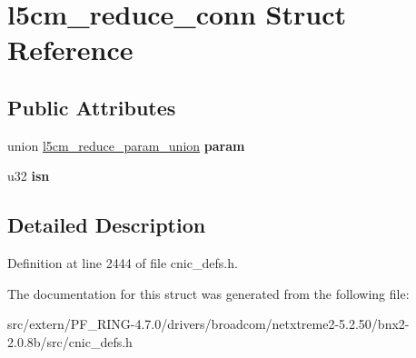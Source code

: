 \hypertarget{structl5cm__reduce__conn}{
\section{l5cm\_\-reduce\_\-conn Struct Reference}
\label{structl5cm__reduce__conn}
}
\subsection*{Public Attributes}
\begin{DoxyCompactItemize}
\item 
\hypertarget{structl5cm__reduce__conn_a21e44f95f33716edc0e60bb5cba24e3f}{
union \hyperlink{unionl5cm__reduce__param__union}{l5cm\_\-reduce\_\-param\_\-union} {\bfseries param}}
\label{structl5cm__reduce__conn_a21e44f95f33716edc0e60bb5cba24e3f}

\item 
\hypertarget{structl5cm__reduce__conn_a1ee63410be8e4631971e844f13263542}{
u32 {\bfseries isn}}
\label{structl5cm__reduce__conn_a1ee63410be8e4631971e844f13263542}

\end{DoxyCompactItemize}


\subsection{Detailed Description}


Definition at line 2444 of file cnic\_\-defs.h.



The documentation for this struct was generated from the following file:\begin{DoxyCompactItemize}
\item 
src/extern/PF\_\-RING-\/4.7.0/drivers/broadcom/netxtreme2-\/5.2.50/bnx2-\/2.0.8b/src/cnic\_\-defs.h\end{DoxyCompactItemize}
